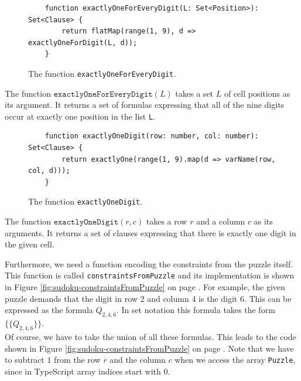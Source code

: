 \begin{figure}[!ht]
\centering
\begin{verbatim}
    function exactlyOneForEveryDigit(L: Set<Position>): Set<Clause> {
        return flatMap(range(1, 9), d => exactlyOneForDigit(L, d));
    }
\end{verbatim}
\vspace*{-0.3cm}
\caption{The function \texttt{exactlyOneForEveryDigit}.}
\label{fig:sudoku-exactlyOneForEveryDigit}
\end{figure}

The function $\texttt{exactlyOneForEveryDigit}(L)$ takes a set $L$ of cell positions as its argument.
It returns a set of formulas expressing that all of the nine digits occur at exactly one position in the list \texttt{L}.

\begin{figure}[!ht]
\centering
\begin{verbatim}
    function exactlyOneDigit(row: number, col: number): Set<Clause> {
        return exactlyOne(range(1, 9).map(d => varName(row, col, d)));
    }
\end{verbatim}
\vspace*{-0.3cm}
\caption{The function \texttt{exactlyOneDigit}.}
\label{fig:sudoku-exactlyOneDigit}
\end{figure}

The function $\mathtt{exactlyOneDigit}(r, c)$ takes a row $r$ and a column $c$ as its arguments.
It returns a set of clauses expressing that there is exactly one digit in the given cell.

Furthermore, we need a function encoding the constraints from the puzzle itself.
This function is called \texttt{constraintsFromPuzzle} and its implementation is shown in Figure
\ref{fig:sudoku-constraintsFromPuzzle} on page \pageref{fig:sudoku-constraintsFromPuzzle}.
For example, the given puzzle demands that the digit in row 2 and column 4 is the digit $6$.
This can be expressed as the formula $Q_{2,4,6}$.  In set notation this formula takes the form
\\[0.2cm]
\hspace*{1.3cm}
$\bigl\{ \{Q_{2,4,6}\} \bigr\}$.
\\[0.2cm]
Of course, we have to take the union of all these formulas.  This leads to the code shown in Figure
\ref{fig:sudoku-constraintsFromPuzzle} on page \pageref{fig:sudoku-constraintsFromPuzzle}.
Note that we have to subtract $1$ from the row $r$ and the column $c$ when we access the array
\texttt{Puzzle}, since in TypeScript array indices start with $0$.

